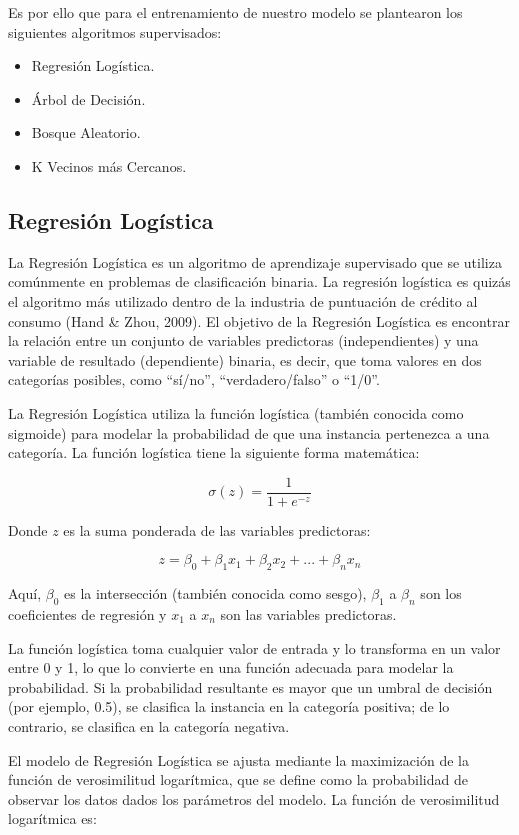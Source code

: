 \documentclass[a4paper,12pt]{article}
\begin{document}
Es por ello que para el entrenamiento de nuestro modelo se plantearon los siguientes algoritmos supervisados:

\begin{itemize}
    \item Regresión Logística.
    \item Árbol de Decisión.
    \item Bosque Aleatorio.
    \item K Vecinos más Cercanos.
\end{itemize}

\subsection{Regresión Logística}

La Regresión Logística es un algoritmo de aprendizaje supervisado que se utiliza comúnmente en problemas de clasificación binaria. La regresión logística es quizás el algoritmo más utilizado dentro de la industria de puntuación de crédito al consumo (Hand \& Zhou, 2009). El objetivo de la Regresión Logística es encontrar la relación entre un conjunto de variables predictoras (independientes) y una variable de resultado (dependiente) binaria, es decir, que toma valores en dos categorías posibles, como ``sí/no'', ``verdadero/falso'' o ``1/0''.

La Regresión Logística utiliza la función logística (también conocida como sigmoide) para modelar la probabilidad de que una instancia pertenezca a una categoría. La función logística tiene la siguiente forma matemática:

$$ \sigma(z) = \frac{1}{1 + e^{-z}} $$

Donde $z$ es la suma ponderada de las variables predictoras:

$$ z = \beta_0 + \beta_1 x_1 + \beta_2 x_2 + ... + \beta_n x_n $$

Aquí, $\beta_0$ es la intersección (también conocida como sesgo), $\beta_1$ a $\beta_n$ son los coeficientes de regresión y $x_1$ a $x_n$ son las variables predictoras.

La función logística toma cualquier valor de entrada y lo transforma en un valor entre 0 y 1, lo que lo convierte en una función adecuada para modelar la probabilidad. Si la probabilidad resultante es mayor que un umbral de decisión (por ejemplo, 0.5), se clasifica la instancia en la categoría positiva; de lo contrario, se clasifica en la categoría negativa.

El modelo de Regresión Logística se ajusta mediante la maximización de la función de verosimilitud logarítmica, que se define como la probabilidad de observar los datos dados los parámetros del modelo. La función de verosimilitud logarítmica es:
\end{document}
